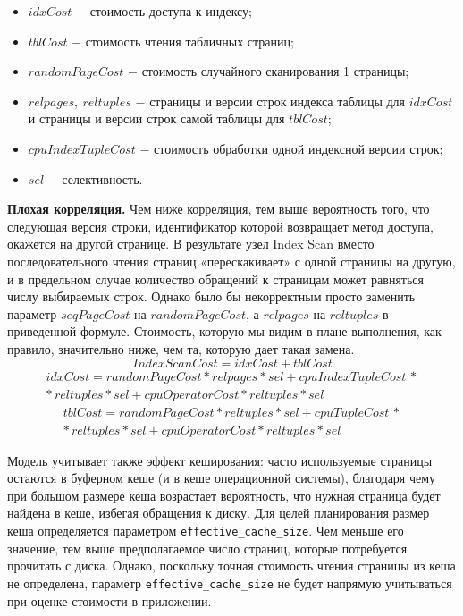 \begin{itemize}
    \item $idxCost$ $-$ стоимость доступа к индексу;
    \item $tblCost$ $-$ стоимость чтения табличных страниц;
    \item $randomPageCost$ $-$ стоимость случайного сканирования 1 страницы;
    \item $relpages, \ reltuples$ $-$ страницы и версии строк индекса таблицы для $idxCost$ и страницы и версии строк самой таблицы для $tblCost$;
    \item $cpuIndexTupleCost$ $-$ стоимость обработки одной индексной версии строк;
    \item $sel$ $-$ селективность.
\end{itemize}

\textbf{Плохая корреляция.} Чем ниже корреляция, тем выше вероятность того, что следующая версия строки, идентификатор которой возвращает метод доступа, окажется на другой странице. В результате узел Index Scan вместо последовательного чтения страниц «перескакивает» с одной страницы на другую, и в предельном случае количество обращений к страницам может равняться числу выбираемых строк. Однако было бы некорректным просто заменить параметр $seqPageCost$ на $randomPageCost$, а $relpages$ на $reltuples$ в приведенной формуле. Стоимость, которую мы видим в плане выполнения, как правило, значительно ниже, чем та, которую дает такая замена.
\begin{equation}
    IndexScanCost = idxCost +tblCost
\end{equation}
\begin{equation}
    \begin{array}{c}
         idxCost = randomPageCost * relpages * sel + cpuIndexTupleCost \, * \\ 
         * \, reltuples* sel + cpuOperatorCost * reltuples * sel
    \end{array}
\end{equation}
\begin{equation}
    \begin{array}{c}
         tblCost = randomPageCost * reltuples * sel + cpuTupleCost \, * \\
         * \, reltuples * sel + cpuOperatorCost * reltuples * sel
    \end{array}
\end{equation}

Модель учитывает также эффект кеширования: часто используемые страницы остаются в буферном кеше (и в кеше операционной системы), благодаря чему при большом размере кеша возрастает вероятность, что нужная страница будет найдена в кеше, избегая обращения к диску. Для целей планирования размер кеша определяется параметром \texttt{effective\_cache\_size}. Чем меньше его значение, тем выше предполагаемое число страниц, которые потребуется прочитать с диска. Однако, поскольку точная стоимость чтения страницы из кеша не определена, параметр \texttt{effective\_cache\_size} не будет напрямую учитываться при оценке стоимости в приложении.

